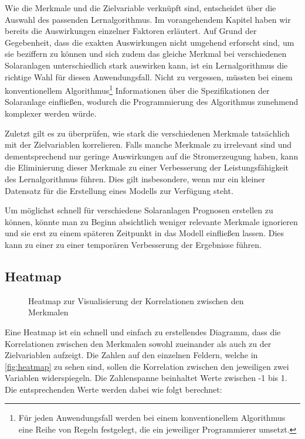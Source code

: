 \documentclass[12pt, a4paper]{article}
\begin{document}
Wie die Merkmale und die Zielvariable verknüpft sind, entscheidet über die Auswahl des passenden Lernalgorithmus. Im vorangehendem Kapitel haben wir bereits die Auswirkungen einzelner Faktoren erläutert. Auf Grund der Gegebenheit, dass die exakten Auswirkungen nicht umgehend erforscht sind, um sie beziffern zu können und sich zudem das gleiche Merkmal bei verschiedenen Solaranlagen unterschiedlich stark auswirken kann, ist ein Lernalgorithmus die richtige Wahl für diesen Anwendungsfall. Nicht zu vergessen, müssten bei einem konventionellem Algorithmus\footnote{Für jeden Anwendungsfall werden bei einem konventionellem Algorithmus eine Reihe von Regeln festgelegt, die ein jeweiliger Programmierer umsetzt.} Informationen über die Spezifikationen der Solaranlage einfließen, wodurch die Programmierung des Algorithmus zunehmend komplexer werden würde.

Zuletzt gilt es zu überprüfen, wie stark die verschiedenen Merkmale tatsächlich mit der Zielvariablen korrelieren. Falls manche Merkmale zu irrelevant sind und dementsprechend nur geringe Auswirkungen auf die Stromerzeugung haben, kann die Eliminierung dieser Merkmale zu einer Verbesserung der Leistungsfähigkeit des Lernalgorithmus führen. Dies gilt insbesondere, wenn nur ein kleiner Datensatz für die Erstellung eines Modells zur Verfügung steht. 

Um möglichst schnell für verschiedene Solaranlagen Prognosen erstellen zu können, könnte man zu Beginn absichtlich weniger relevante Merkmale ignorieren und sie erst zu einem späteren Zeitpunkt in das Modell einfließen lassen. Dies kann zu einer zu einer temporären Verbesserung der Ergebnisse führen.

\subsection{Heatmap}

\begin{figure}[H]
\centering
\def\svgwidth{375pt}

\caption{Heatmap zur Visualisierung der Korrelationen zwischen den Merkmalen}
\label{fig:heatmap}
\end {figure}

Eine Heatmap ist ein schnell und einfach zu erstellendes Diagramm, dass die Korrelationen zwischen den Merkmalen sowohl zueinander als auch zu der Zielvariablen aufzeigt. Die Zahlen auf den einzelnen Feldern, welche in \autoref{fig:heatmap} zu sehen sind, sollen die Korrelation zwischen den jeweiligen zwei Variablen widerspiegeln. Die Zahlenspanne beinhaltet Werte zwischen -1 bis 1. Die entsprechenden Werte werden dabei wie folgt berechnet:
\end{document}

